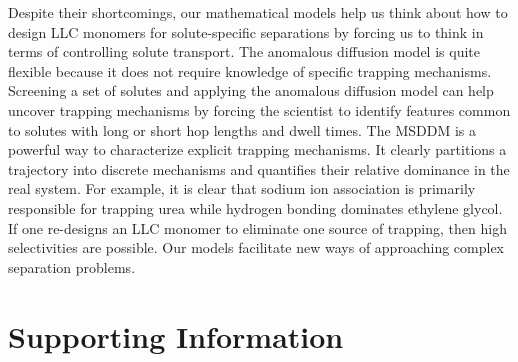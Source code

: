 \documentclass[aps,pre,preprint,groupedaddress]{revtex4-2}
\begin{document}

  Despite their shortcomings, our mathematical models help us think about how 
  to design LLC monomers for solute-specific separations by forcing us to think
  in terms of controlling solute transport. The anomalous diffusion model is 
  quite flexible because it does not require knowledge of specific trapping 
  mechanisms. Screening a set of solutes and applying the anomalous diffusion 
  model can help uncover trapping mechanisms by forcing the scientist to 
  identify features common to solutes with long or short hop lengths and dwell
  times. The MSDDM is a powerful way to characterize explicit trapping mechanisms.
  It clearly partitions a trajectory into discrete mechanisms and quantifies their
  relative dominance in the real system. For example, it is clear that 
  sodium ion association is primarily responsible for trapping urea while 
  hydrogen bonding dominates ethylene glycol. If one re-designs an LLC monomer
  to eliminate one source of trapping, then high selectivities are possible.
  Our models facilitate new ways of approaching complex separation problems.
  
  \section*{Supporting Information}
\end{document}
